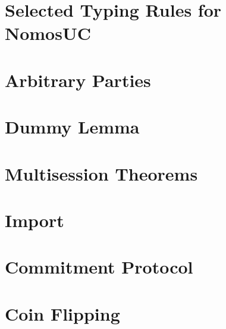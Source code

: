 \documentclass[acmsmall, screen, review, anonymous]{acmart}
\begin{document}
\section{Selected Typing Rules for NomosUC} \label{app:typing_rules}


\section{Arbitrary Parties} \label{app:arbparties}


\section{Dummy Lemma} \label{app:dummy}


\section{Multisession Theorems} \label{app:ms}


\section{Import} \label{app:import}


\section{Commitment Protocol} \label{app:protcom}


\section{Coin Flipping} \label{app:flip}


%

%

%

\pagebreak

%
\end{document}
